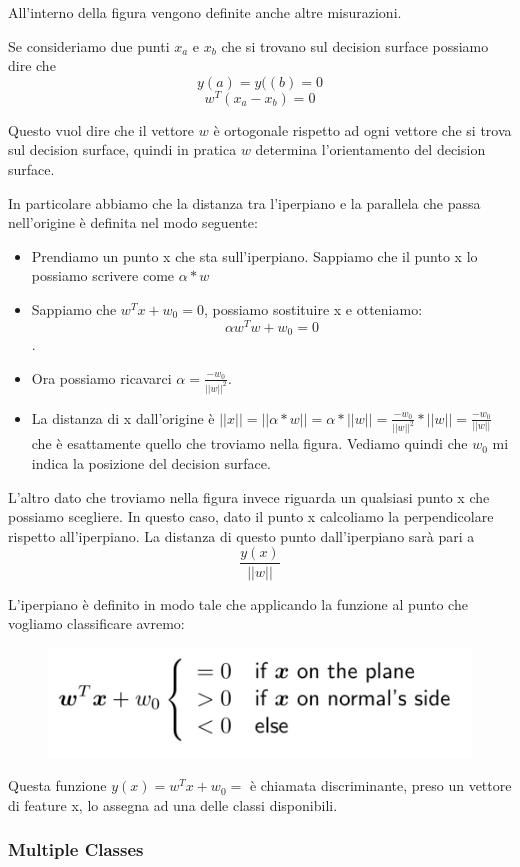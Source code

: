 \documentclass[14pt]{extreport}
\begin{document}
All'interno della figura vengono definite anche altre misurazioni.

Se consideriamo due punti $x_a$ e $x_b$ che si trovano sul decision surface possiamo dire che $$y(a) = y((b) = 0$$
$$w^T(x_a-x_b)=0$$

Questo vuol dire che il vettore $w$ è ortogonale rispetto ad ogni vettore che si trova sul decision surface, quindi in pratica $w$ determina
l'orientamento del decision surface.

In particolare abbiamo che la distanza tra l'iperpiano e la parallela che passa nell'origine è definita nel modo seguente:
\begin{itemize}
	\item Prendiamo un punto x che sta sull'iperpiano. Sappiamo che il punto x lo possiamo scrivere come $\alpha * w$
	\item Sappiamo che $w^Tx + w_0 = 0$, possiamo sostituire x e otteniamo: $$\alpha w^T w + w_0 = 0$$.
	\item Ora possiamo ricavarci $\alpha = \frac{-w_0}{||w||^2}$.
	\item La distanza di x dall'origine è $||x|| = ||\alpha * w|| = \alpha * ||w|| = \frac{-w_0}{||w||^2} * ||w|| = \frac{-w_0}{||w||}$ che è
	      esattamente quello che troviamo nella figura. Vediamo quindi che $w_0$ mi indica la posizione del decision surface.
\end{itemize}

L'altro dato che troviamo nella figura invece riguarda un qualsiasi punto x che possiamo scegliere. In questo caso, dato il punto x calcoliamo la
perpendicolare rispetto all'iperpiano. La distanza di questo punto dall'iperpiano sarà pari a $$\frac{y(x)}{||w||}$$


L'iperpiano è definito in modo tale che applicando la funzione al punto che vogliamo classificare avremo:
\begin{figure}[H]
	\centering
	\includegraphics[width=0.5\linewidth]{147.jpeg}
\end{figure}

Questa funzione $y(x) = w^Tx+w_0=$ è chiamata discriminante, preso un vettore di feature x, lo assegna ad una delle classi disponibili.

\subsubsection{Multiple Classes}
\end{document}
